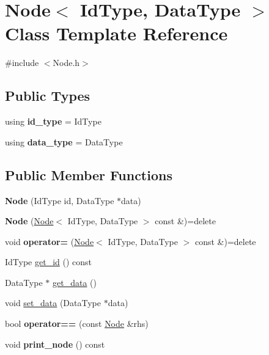 \hypertarget{class_node}{}\section{Node$<$ Id\+Type, Data\+Type $>$ Class Template Reference}
\label{class_node}


{\ttfamily \#include $<$Node.\+h$>$}

\subsection*{Public Types}
\begin{DoxyCompactItemize}
\item 
\mbox{\label{class_node_a34e663ba0743b92d8c4c973d79c31167}} 
using {\bfseries id\+\_\+type} = Id\+Type
\item 
\mbox{\label{class_node_a67483d21d12ec195270a4a2f67cdb15c}} 
using {\bfseries data\+\_\+type} = Data\+Type
\end{DoxyCompactItemize}
\subsection*{Public Member Functions}
\begin{DoxyCompactItemize}
\item 
\mbox{\label{class_node_a28ce892501d4a71ec6b09089fb26b364}} 
{\bfseries Node} (Id\+Type id, Data\+Type $\ast$data)
\item 
\mbox{\label{class_node_af68de58ae2ec8491178bbc5772ef0307}} 
{\bfseries Node} (\hyperlink{class_node}{Node}$<$ Id\+Type, Data\+Type $>$ const \&)=delete
\item 
\mbox{\label{class_node_a91a00c2113b013f055c3cae5cd14aed4}} 
void {\bfseries operator=} (\hyperlink{class_node}{Node}$<$ Id\+Type, Data\+Type $>$ const \&)=delete
\item 
Id\+Type \hyperlink{class_node_a86f1bba05a74b854ba12dc3ac3d1f491}{get\+\_\+id} () const
\item 
Data\+Type $\ast$ \hyperlink{class_node_abd0500a7483af56c57087d408a0dd46d}{get\+\_\+data} ()
\item 
void \hyperlink{class_node_a29f690cf38cfd834ebc6ad6037275cf0}{set\+\_\+data} (Data\+Type $\ast$data)
\item 
\mbox{\label{class_node_a6c7ea4284c2fb31048de0819681c6c73}} 
bool {\bfseries operator==} (const \hyperlink{class_node}{Node} \&rhs)
\item 
\mbox{\label{class_node_a40f154dae3291d8ad01543ebdcdbf783}} 
void {\bfseries print\+\_\+node} () const
\end{DoxyCompactItemize}
